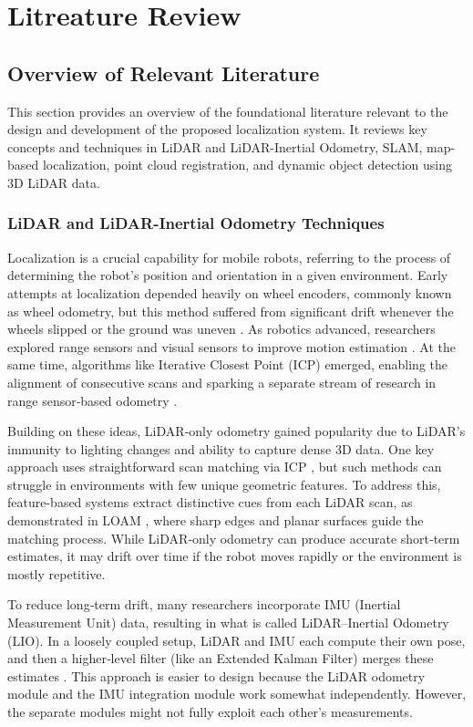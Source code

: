 \chapter{Litreature Review}
\label{ch:intro}
\section{Overview of Relevant Literature}
This section provides an overview of the foundational literature relevant to the design and development of the proposed localization system. It reviews key concepts and techniques in LiDAR and LiDAR-Inertial Odometry, SLAM, map-based localization, point cloud registration, and dynamic object detection using 3D LiDAR data.

\subsection{LiDAR and LiDAR-Inertial Odometry Techniques}
Localization is a crucial capability for mobile robots, referring to the process of determining the robot’s position and orientation in a given environment. Early attempts at localization depended heavily on wheel encoders, commonly known as wheel odometry, but this method suffered from significant drift whenever the wheels slipped or the ground was uneven \cite{MohamedOdometry}. As robotics advanced, researchers explored range sensors and visual sensors to improve motion estimation \cite{WangVisionSurvey}. At the same time, algorithms like Iterative Closest Point (ICP) emerged, enabling the alignment of consecutive scans and sparking a separate stream of research in range sensor‐based odometry \cite{BeslICP1992}.

Building on these ideas, LiDAR‐only odometry gained popularity due to LiDAR’s immunity to lighting changes and ability to capture dense 3D data. One key approach uses straightforward scan matching via ICP \cite{BeslICP1992}, but such methods can struggle in environments with few unique geometric features. To address this, feature-based systems extract distinctive cues from each LiDAR scan, as demonstrated in LOAM \cite{ZhangSinghLOAM2014}, where sharp edges and planar surfaces guide the matching process. While LiDAR‐only odometry can produce accurate short‐term estimates, it may drift over time if the robot moves rapidly or the environment is mostly repetitive.

To reduce long‐term drift, many researchers incorporate IMU (Inertial Measurement Unit) data, resulting in what is called LiDAR–Inertial Odometry (LIO). In a loosely coupled setup, LiDAR and IMU each compute their own pose, and then a higher‐level filter (like an Extended Kalman Filter) merges these estimates \cite{TangLooselyCoupled}. This approach is easier to design because the LiDAR odometry module and the IMU integration module work somewhat independently. However, the separate modules might not fully exploit each other’s measurements.

